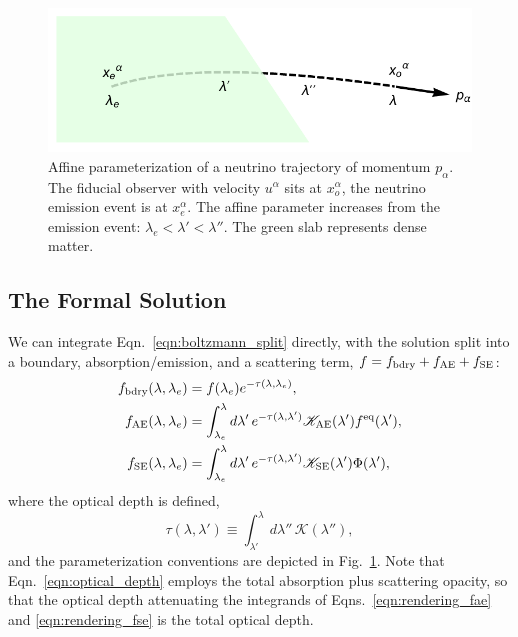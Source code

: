 \documentclass[aps,floatfix,prd,superscriptaddress,twocolumn]{revtex4-1}
\begin{document}
\begin{figure}
  \includegraphics[width=\columnwidth]{fig-affine_parameter_label}
  \caption{Affine parameterization of a neutrino trajectory of momentum
    $p_\alpha$.
    The fiducial observer with velocity $u^\alpha$ sits at $x^\alpha_o$,
    the neutrino emission event is at $x^\alpha_e$. The affine parameter
    increases from the emission event: $\lambda_e<\lambda'<\lambda''$.
    The green slab represents dense matter.}
  \label{fig:affine_param}
\end{figure}

\subsection{The Formal Solution}
\label{ssec:rendering_eqn}
We can integrate Eqn.~\ref{eqn:boltzmann_split} directly, 
with the solution split into a boundary, absorption/emission, and
a scattering term, $f=f_{\rm bdry}+f_{\rm AE}+f_{\rm SE}$:
\begin{align}
  \label{eqn:rendering_fbdry}
  f_{\rm bdry}(\lambda,\lambda_e)
  &= f(\lambda_e) e^{-\tau(\lambda,\lambda_e)}, \\
  \label{eqn:rendering_fae}
  f_{\rm AE}(\lambda,\lambda_e)
  &= \int_{\lambda_e}^\lambda d\lambda'\,e^{-\tau(\lambda,\lambda')}
  \mathscr{K}_{\rm AE}(\lambda')f^{\rm eq}(\lambda'), \\
  \label{eqn:rendering_fse}
  f_{\rm SE}(\lambda,\lambda_e)
  &= \int_{\lambda_e}^\lambda d\lambda'\,e^{-\tau(\lambda,\lambda')}
  \mathscr{K}_{\rm SE}(\lambda')\Phi(\lambda'),
\end{align}
where the optical depth is defined,
\begin{equation}
  \label{eqn:optical_depth}
  \tau(\lambda,\lambda') \equiv \int_{\lambda'}^\lambda
  d\lambda'' \, \mathscr{K}(\lambda''),
\end{equation}
and the parameterization conventions are depicted in
Fig.~\ref{fig:affine_param}.
Note that Eqn.~\ref{eqn:optical_depth} employs the total absorption
plus scattering opacity, so that the optical depth attenuating the
integrands of Eqns.~\ref{eqn:rendering_fae} and \ref{eqn:rendering_fse}
is the total optical depth.
\end{document}
